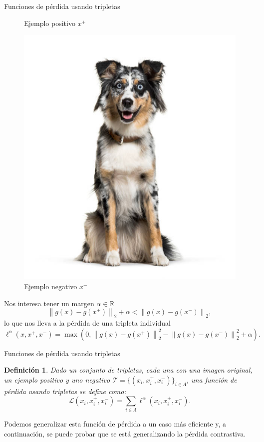 \documentclass[aspectratio=169]{beamer}
\newcommand{\R}{\mathbb{R}}
\newcommand{\norm}[1]{\left\lVert#1\right\rVert}
\newcommand{\ps}{x^+}
\newcommand{\ns}{x^-}
\newtheorem{defi}{Definición}
\begin{document}
\begin{frame}{Funciones de pérdida usando tripletas}
\begin{figure}[H]
      \caption*{Ejemplo positivo $\ps$}\label{fig:c2}
      \endminipage
      \centering
      \includegraphics[scale=0.1]{doggo}
      \caption*{Ejemplo negativo $\ns$}\label{fig:doggo}
      \endminipage
    \end{figure}

    Nos interesa tener un margen \(\alpha \in \R\)
    \[
    \norm{g(x) - g(\ps)}_2 + \alpha < \norm{g(x) - g(\ns)}_2,
    \]
    lo que nos lleva a la pérdida de una tripleta individual
    \[
      \ell^\alpha (x,\ps,\ns) = \max \left(0, \norm{g(x) - g(\ps)}_2^2 - \norm{g(x) - g(\ns)}_2^2 + \alpha\right).
    \]

  \end{frame}
  
  \begin{frame}{Funciones de pérdida usando tripletas}


    \begin{defi}
      Dado un conjunto de tripletas, cada una con una imagen original, un ejemplo positivo y uno negativo  \(\mathcal T = \{(x_i,\ps_i,\ns_i)\}_{i \in \Lambda} \), una función de pérdida usando tripletas se define como:
      \[
      \mathcal L (x_i,\ps_i,\ns_i) = \sum_{i \in \Lambda} \ell^\alpha(x_i,\ps_i,\ns_i).
      \]



    \end{defi}
    
    
    Podemos generalizar esta función de pérdida a un caso más eficiente y, a continuación, se puede probar que se está generalizando la pérdida contrastiva.
    
  
  \end{frame}
\end{document}
